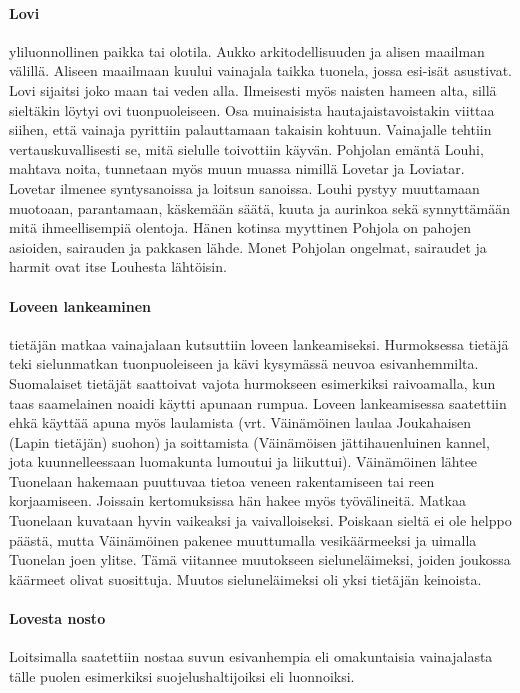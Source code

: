   \paragraph{Lovi} yliluonnollinen paikka tai olotila. Aukko arkitodellisuuden ja alisen maailman 
    välillä. Aliseen maailmaan kuului vainajala taikka tuonela, jossa esi-isät asustivat. Lovi 
    sijaitsi joko maan tai veden alla. Ilmeisesti myös naisten hameen alta, sillä sieltäkin 
    löytyi ovi tuonpuoleiseen. Osa muinaisista hautajaistavoistakin viittaa siihen, että vainaja 
    pyrittiin palauttamaan takaisin kohtuun. Vainajalle tehtiin vertauskuvallisesti se, mitä 
    sielulle toivottiin käyvän. Pohjolan emäntä Louhi, mahtava noita, tunnetaan myös muun muassa 
    nimillä Lovetar ja Loviatar. Lovetar ilmenee syntysanoissa ja loitsun sanoissa. Louhi pystyy 
    muuttamaan muotoaan, parantamaan, käskemään säätä, kuuta ja aurinkoa sekä synnyttämään mitä 
    ihmeellisempiä olentoja. Hänen kotinsa myyttinen Pohjola on pahojen asioiden, sairauden ja 
    pakkasen lähde. Monet Pohjolan ongelmat, sairaudet ja harmit ovat itse Louhesta lähtöisin.
  \paragraph{Loveen lankeaminen} tietäjän matkaa vainajalaan kutsuttiin loveen lankeamiseksi. 
    Hurmoksessa tietäjä teki sielunmatkan tuonpuoleiseen ja kävi kysymässä neuvoa esivanhemmilta.  
    Suomalaiset tietäjät saattoivat vajota hurmokseen esimerkiksi raivoamalla, kun taas 
    saamelainen noaidi käytti apunaan rumpua. Loveen lankeamisessa saatettiin ehkä käyttää apuna 
    myös laulamista (vrt. Väinämöinen laulaa Joukahaisen (Lapin tietäjän) suohon) ja 
    soittamista (Väinämöisen jättihauenluinen kannel, jota kuunnelleessaan luomakunta lumoutui 
    ja liikuttui). Väinämöinen lähtee Tuonelaan hakemaan puuttuvaa tietoa veneen rakentamiseen 
    tai reen korjaamiseen. Joissain kertomuksissa hän hakee myös työvälineitä. Matkaa Tuonelaan 
    kuvataan hyvin vaikeaksi ja vaivalloiseksi. Poiskaan sieltä ei ole helppo päästä, mutta 
    Väinämöinen pakenee muuttumalla vesikäärmeeksi ja uimalla Tuonelan joen ylitse. Tämä 
    viitannee muutokseen sieluneläimeksi, joiden joukossa käärmeet olivat suosittuja. Muutos 
    sieluneläimeksi oli yksi tietäjän keinoista.
  \paragraph{Lovesta nosto} Loitsimalla saatettiin nostaa suvun esivanhempia eli omakuntaisia 
    vainajalasta tälle puolen esimerkiksi suojelushaltijoiksi eli luonnoiksi.
